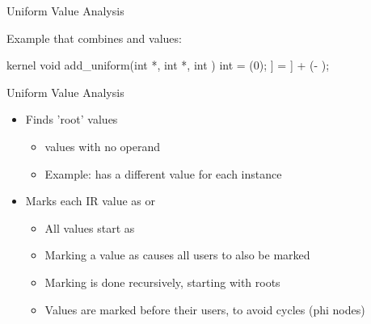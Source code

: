 \begin{frame}[fragile]{Uniform Value Analysis}

Example that combines  and  values:

\begin{codebox}[commandchars=\\\[\]]
kernel void add_uniform(int *\uniform[dst], int *\uniform[src], int \uniform[alpha]) {
    int \varying[tid] = (0);
    \uniform[dst]\idx[\varying[tid]] = \uniform[src]\idx[\varying[tid]] + (\uniform[alpha] - \uniform[1]);
}
\end{codebox}


\end{frame}


\begin{frame}{Uniform Value Analysis}

\begin{itemize}
    \item Finds 'root' values
    \begin{itemize}
        \item {} values with no  operand
        \item Example:  has a different value for each instance
    \end{itemize}
    \item Marks each IR value as  or 
    \begin{itemize}
        \item All values start as 
        \item Marking a value as  causes all users to also be marked 
        \item Marking is done recursively, starting with roots
        \item Values are marked before their users, to avoid cycles (phi nodes)
    \end{itemize}
\end{itemize}

\end{frame}

